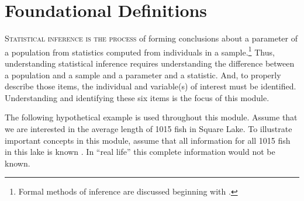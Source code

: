 

\chapter{Foundational Definitions} \label{chap:FoundationalDefinitions}

\minitoc
\vspace{18pt}

\lettrine{S}{tatistical inference is the process} of forming conclusions about a parameter of a population from statistics computed from individuals in a sample.\footnote{Formal methods of inference are discussed beginning with .} Thus, understanding statistical inference requires understanding the difference between a population and a sample and a parameter and a statistic. And, to properly describe those items, the individual and variable(s) of interest must be identified. Understanding and identifying these six items is the focus of this module.

The following hypothetical example is used throughout this module. Assume that we are interested in the average length of 1015 fish in Square Lake. To illustrate important concepts in this module, assume that all information for all 1015 fish in this lake is known . In ``real life'' this complete information would not be known.

\begin{knitrout}
\color{fgcolor}\begin{kframe}


{\ttfamily\noindent\color{warningcolor}{\#\# Warning in data(SquareLakePopn): data set 'SquareLakePopn' not found}}

{\ttfamily\noindent\bfseries\color{errorcolor}{\#\# Error in nrow(SquareLakePopn): object 'SquareLakePopn' not found}}

{\ttfamily\noindent\bfseries{}}

{\ttfamily\noindent\bfseries{}}

{\ttfamily\noindent\bfseries{}}

{\ttfamily\noindent\bfseries{}}

{\ttfamily\noindent\bfseries\color{errorcolor}{\#\# Error in eval(expr, envir, enclos): object 'SLpop' not found}}\end{kframe}
\end{knitrout}













